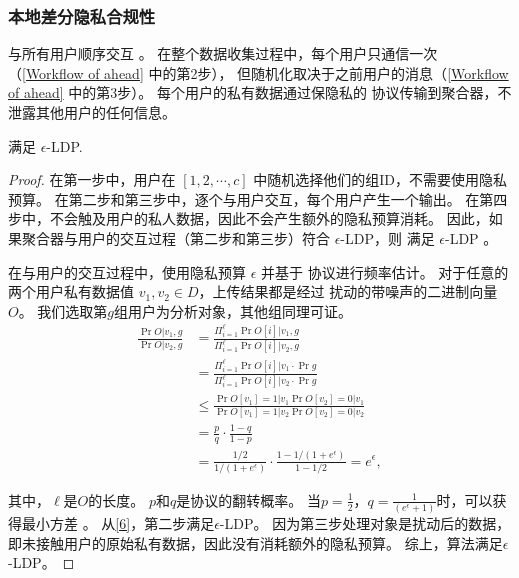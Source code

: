 \subsubsection{本地差分隐私合规性}

\myahead 与所有用户顺序交互 \cite{joseph2019role, joseph2020exponential, duchi2013local, acharya2020interactive, kasiviswanathan2011can}。
在整个数据收集过程中，每个用户只通信一次（\autoref{Workflow of ahead} 中的第2步），
但随机化取决于之前用户的消息（\autoref{Workflow of ahead} 中的第3步）。
每个用户的私有数据通过保隐私的 \oue 协议传输到聚合器，不泄露其他用户的任何信息。

\begin{theorem}
    \label{satisfy LDP}
    \myahead 满足 $\epsilon$-LDP.
\end{theorem} 
\begin{proof}
    在第一步中，用户在 $[1,2, \cdots, c]$ 中随机选择他们的组ID，不需要使用隐私预算。
    在第二步和第三步中，\myahead 逐个与用户交互，每个用户产生一个输出。
    在第四步中，\myahead 不会触及用户的私人数据，因此不会产生额外的隐私预算消耗。
    因此，如果聚合器与用户的交互过程（第二步和第三步）符合 $\epsilon$-LDP，则 \myahead 满足 $\epsilon$-LDP \cite{joseph2020exponential}。
    
    在与用户的交互过程中，\myahead 使用隐私预算 $\epsilon$ 并基于 \oue 协议进行频率估计。
    对于任意的两个用户私有数据值 $v_1, v_2 \in D$，上传结果都是经过 \oue 扰动的带噪声的二进制向量 $O$。
    我们选取第$g$组用户为分析对象，其他组同理可证。
    \begin{align}\label{6}
        \frac{\Pr{O|v_1, g}}{\Pr{O|v_2, g}} &= \frac{\Pi_{i=1}^{\ell}\Pr{O[i]|v_1, g}}{\Pi_{i=1}^{\ell}\Pr{O[i]|v_2, g}} \nonumber \\
                              &= \frac{\Pi_{i=1}^{\ell}\Pr{O[i]|v_1} \cdot \Pr g}{\Pi_{i=1}^{\ell}\Pr{O[i]|v_2} \cdot \Pr g} \nonumber \\
                                                &\leq{\frac{\Pr{O[v_1]=1|v_1}\Pr{O[v_2]=0|v_1}}{\Pr{O[v_1]=1|v_2}\Pr{O[v_2]=0|v_2}}} \nonumber \\
                                                &= \frac{p}{q}\cdot\frac{1-q}{1-p} \nonumber \\
                                                &= \frac{1/2}{1/(1+e^\epsilon)}\cdot\frac{1-1/(1+e^\epsilon)}{1-1/2}= e^\epsilon, 
    \end{align}

    其中，$\ell$是$O$的长度。
    $p$和$q$是\oue 协议的翻转概率。
    当$p = \frac{1}{2}$，$q = \frac{1}{(e^\epsilon +1)}$时，\oue 可以获得最小方差 {\rm\cite{wang2017locally}}。
    从{\rm\autoref{6}}，第二步满足$\epsilon$-LDP。
    因为第三步处理对象是扰动后的数据，即未接触用户的原始私有数据，因此没有消耗额外的隐私预算。
    综上，\myahead 算法满足$\epsilon$-LDP。
\end{proof}



